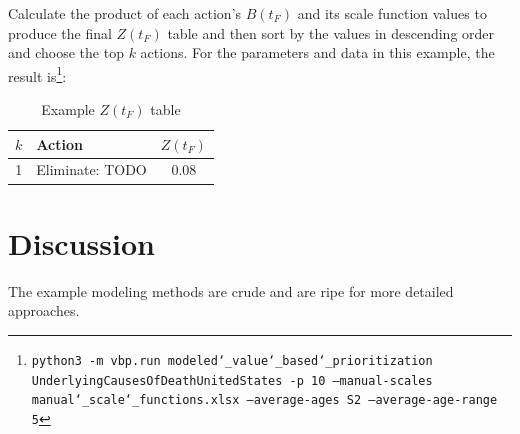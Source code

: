 \documentclass[12pt, a4paper, twocolumn]{article}
\begin{document}
Calculate the product of each action's $B(t_F)$ and its scale function values to produce the final $Z(t_F)$ table and then sort by the values in descending order and choose the top $k$ actions. For the parameters and data in this example, the result is\footnote{\texttt{python3 -m vbp.run modeled\char`_value\char`_based\char`_prioritization UnderlyingCausesOfDeathUnitedStates -p 10 --manual-scales manual\char`_scale\char`_functions.xlsx --average-ages S2 --average-age-range 5}}:

\begin{table}[H]
  \centering
  \begin{tabular}{clc}
    \toprule
      $k$ & Action          & $Z(t_F)$ \\
    \midrule
      1   & Eliminate: TODO & 0.08     \\
    \bottomrule
  \end{tabular}
  \caption{Example $Z(t_F)$ table}
  \label{table:ztable}
\end{table}

\section{Discussion}

The example modeling methods are crude and are ripe for more detailed approaches.



\end{document}
